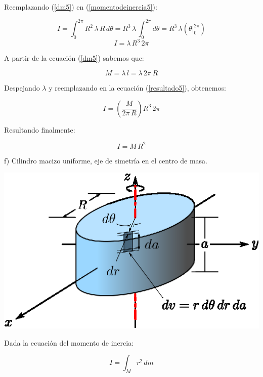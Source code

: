 \documentclass[letter,11pt]{article}
\begin{document}
Reemplazando (\ref{dm5}) en (\ref{momentodeinercia5}):

\begin{equation*}
    I = \int_{0}^{2\pi} R^2\, \lambda\, R\, d\theta = R^3\, \lambda\, \int_{0}^{2\pi} d\theta = R^3\, \lambda (\theta \Biggr|_{0}^{2\pi})
\end{equation*}
\begin{equation}
    I = \lambda\, R^3\, 2\pi
\label{resultado5}
\end{equation}

A partir de la ecuación (\ref{dm5}) sabemos que:

\begin{equation*}
    M = \lambda\, l = \lambda\, 2\pi\, R
\end{equation*}

Despejando $\lambda$ y reemplazando en la ecuación (\ref{resultado5}), obtenemos:

\begin{equation*}
    I = \left( \frac{M}{2\pi\, R} \right) R^3\, 2\pi
\end{equation*}

Resultando finalmente:

\begin{equation}
    I = M\, R^2
\end{equation}

\newpage
f) Cilindro macizo uniforme, eje de simetría en el centro de masa.

\begin{center}
\includegraphics[scale=1.25]{resources/f6.eps}
\end{center}

Dada la ecuación del momento de inercia:

\begin{equation}
    I = \int_{M} r^2\, dm
\label{momentodeinercia6}
\end{equation}
\end{document}
